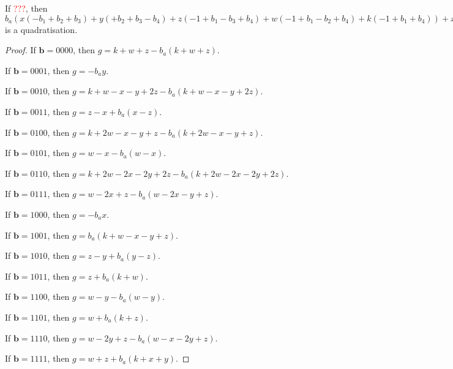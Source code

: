 \documentclass[11pt]{scrartcl}
\newcommand{\vc}[1]{\boldsymbol{#1}}
\begin{document}
\begin{lemma}
 If \textcolor{red}{???}, then $b_a(x(-b_1+b_2+b_3)+y(+b_2+b_3-b_4)+z(-1+b_1-b_3+b_4)+w(-1+b_1-b_2+b_4)+k(-1+b_1+b_4))+x(-b_2-b_3+b_1b_2+b_1b_3)+y(-b_2-b_3+b_2b_4+b_3b_4)+z(+1 -b_1+b_3-b_4+b_1b_4)+w(+1 -b_1+b_2-b_4+b_1b_4)+k(+1 -b_1-b_4+b_1b_4)$ is a quadratisation.\\
 \end{lemma}

\begin{proof}
If $\vc b = 0000$, then $g = k + w + z - b_a(k + w + z)$.

If $\vc b = 0001$, then $g = -b_ay$.

If $\vc b = 0010$, then $g = k + w - x - y + 2z - b_a(k + w - x - y + 2z)$.

If $\vc b = 0011$, then $g = z - x + b_a(x - z)$.

If $\vc b = 0100$, then $g = k + 2w - x - y + z - b_a(k + 2w - x - y + z)$.

If $\vc b = 0101$, then $g = w - x - b_a(w - x)$.

If $\vc b = 0110$, then $g = k + 2w - 2x - 2y + 2z - b_a(k + 2w - 2x - 2y + 2z)$.

If $\vc b = 0111$, then $g = w - 2x + z - b_a(w - 2x - y + z)$.

If $\vc b = 1000$, then $g = -b_ax$.

If $\vc b = 1001$, then $g = b_a(k + w - x - y + z)$.

If $\vc b = 1010$, then $g = z - y + b_a(y - z)$.

If $\vc b = 1011$, then $g = z + b_a(k + w)$.

If $\vc b = 1100$, then $g = w - y - b_a(w - y)$.

If $\vc b = 1101$, then $g = w + b_a(k + z)$.

If $\vc b = 1110$, then $g = w - 2y + z - b_a(w - x - 2y + z)$.

If $\vc b = 1111$, then $g = w + z + b_a(k + x + y)$.

\end{proof}
\end{document}
